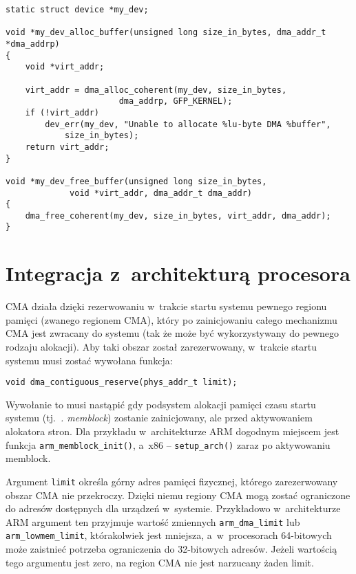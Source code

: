 \begin{lstlisting}[float=tbhp,caption={Alokacja bufora DMA z~użyciem
      DMA API.},label=lst:dma-alloc-example]
static struct device *my_dev;

void *my_dev_alloc_buffer(unsigned long size_in_bytes, dma_addr_t *dma_addrp)
{
	void *virt_addr;

	virt_addr = dma_alloc_coherent(my_dev, size_in_bytes,
				       dma_addrp, GFP_KERNEL);
	if (!virt_addr)
		dev_err(my_dev, "Unable to allocate %lu-byte DMA %buffer",
			size_in_bytes);
	return virt_addr;
}

void *my_dev_free_buffer(unsigned long size_in_bytes,
			 void *virt_addr, dma_addr_t dma_addr)
{
	dma_free_coherent(my_dev, size_in_bytes, virt_addr, dma_addr);
}
\end{lstlisting}


\section{Integracja z~architekturą procesora}\label{sec:integrate-with-arch}

CMA działa dzięki rezerwowaniu w~trakcie startu systemu pewnego
regionu pamięci (zwanego regionem CMA), który po zainicjowaniu całego
mechanizmu CMA jest zwracany do systemu (tak że może być
wykorzystywany do pewnego rodzaju alokacji).  Aby taki obszar został
zarezerwowany, w~trakcie startu systemu musi zostać wywołana funkcja:

\begin{lstlisting}
void dma_contiguous_reserve(phys_addr_t limit);
\end{lstlisting}

Wywołanie to musi nastąpić gdy podsystem alokacji pamięci czasu startu
systemu (tj.\ {\it. memblock}) zostanie zainicjowany, ale przed
aktywowaniem alokatora stron.  Dla przykładu w~architekturze ARM
dogodnym miejscem jest funkcja \lstinline|arm_memblock_init()|, a~x86
-- \lstinline|setup_arch()| zaraz po aktywowaniu memblock.

Argument \lstinline|limit| określa górny adres pamięci fizycznej,
którego zarezerwowany obszar CMA nie przekroczy.  Dzięki niemu regiony
CMA mogą zostać ograniczone do adresów dostępnych dla urządzeń
w~systemie.  Przykładowo w~architekturze ARM argument ten przyjmuje
wartość zmiennych \lstinline|arm_dma_limit| lub
\lstinline|arm_lowmem_limit|, którakolwiek jest mniejsza,
a~w~procesorach 64-bitowych może zaistnieć potrzeba ograniczenia do
32-bitowych adresów.  Jeżeli wartością tego argumentu jest zero, na
region CMA nie jest narzucany żaden limit.

